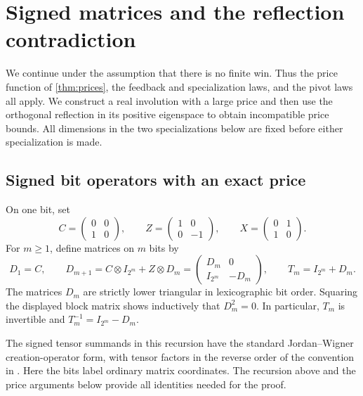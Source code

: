 \section{Signed matrices and the reflection contradiction}
\label{reflect:section}

We continue under the assumption that there is no finite win.  Thus the
price function of \cref{thm:prices}, the feedback and specialization laws,
and the pivot laws all apply.  We construct a real involution with a large
price and then use the orthogonal reflection in its positive eigenspace
to obtain incompatible price bounds.  All dimensions in the two
specializations below are fixed before either specialization is made.

\subsection{Signed bit operators with an exact price}

On one bit, set
\[
 C=\begin{pmatrix}0&0\\1&0\end{pmatrix},\qquad
 Z=\begin{pmatrix}1&0\\0&-1\end{pmatrix},\qquad
 X=\begin{pmatrix}0&1\\1&0\end{pmatrix}.
\]
For $m\geq 1$, define matrices on $m$ bits by
\begin{equation}
 D_1=C,\qquad
 D_{m+1}=C\otimes I_{2^m}+Z\otimes D_m
       =\begin{pmatrix}D_m&0\\ I_{2^m}&-D_m\end{pmatrix},
 \qquad T_m=I_{2^m}+D_m.
 \label{reflect:signed-recursion}
\end{equation}
The matrices $D_m$ are strictly lower triangular in lexicographic bit
order.  Squaring the displayed block matrix shows inductively that
$D_m^2=0$.  In particular, $T_m$ is invertible and
$T_m^{-1}=I_{2^m}-D_m$.

The signed tensor summands in this recursion have the standard
Jordan--Wigner creation-operator form, with tensor factors in the reverse
order of the convention in
\citet[Section~II.B, Equations~(10)--(11)]{seeleyRichardLove2012}.
Here the bits label ordinary matrix coordinates. The recursion above
and the price arguments below provide all identities needed for the
proof.

